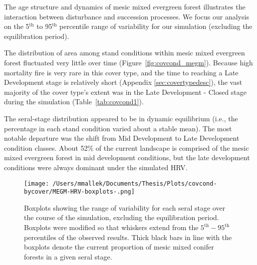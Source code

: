 

The age structure and dynamics of mesic mixed evergreen forest illustrates the interaction between disturbance and succession processes. We focus our analysis on the 5$^{\text{th}}$ to 95$^{\text{th}}$ percentile range of variability for our simulation (excluding the equilibration period). %

The distribution of area among stand conditions within mesic mixed evergreen forest fluctuated very little over time (Figure~\ref{fig:covcond_megm}). Because high mortality fire is very rare in this cover type, and the time to reaching a Late Development stage is relatively short (Appendix \ref{sec:covertypedesc}), the vast majority of the cover type's extent was in the Late Development - Closed stage during the simulation (Table~\ref{tab:covcond1}). %

The seral-stage distribution appeared to be in dynamic equilibrium (i.e., the percentage in each stand condition varied about a stable mean). The most notable departure was the shift from Mid Development to Late Development condition classes. About 52\% of the current landscape is comprised of the mesic mixed evergreen forest in mid development conditions, but the late development conditions were always dominant under the simulated HRV. 

\begin{figure}[!htbp]
  \centering
    \texttt{[image: /Users/mmallek/Documents/Thesis/Plots/covcond-bycover/MEGM-HRV-boxplots-.png]}
  \caption{Boxplots showing the range of variability for each seral stage over the course of the simulation, excluding the equilibration period. Boxplots were modified so that whiskers extend from the $5^{\text{th}} - 95^{\text{th}}$ percentiles of the observed results. Thick black bars in line with the boxplots denote the current proportion of mesic mixed conifer forests in a given seral stage.} 
  \label{fig:covcond_megm_boxplots}
\end{figure}

